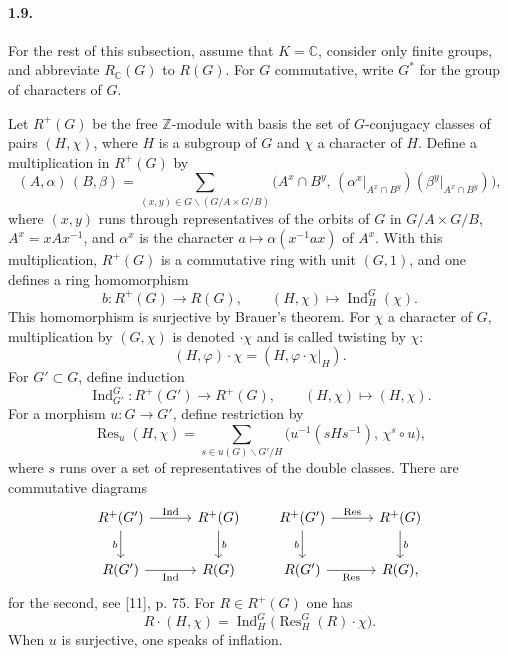 \documentclass[10pt]{article}
\newcommand{\C}{\mathbb C}
\newcommand{\Z}{\mathbb Z}
\newcommand{\Ind}{\operatorname{Ind}}
\newcommand{\Res}{\operatorname{Res}}
\begin{document}
\paragraph{1.9.} For the rest of this subsection, assume that \(K=\C\), consider only finite groups, and abbreviate \(R_\C(G)\) to \(R(G)\). For \(G\) commutative, write \(G^*\) for the group of characters of \(G\).

Let \(R^+(G)\) be the free \(\Z\)-module with basis the set of \(G\)-conjugacy classes of pairs \((H,\chi)\), where \(H\) is a subgroup of \(G\) and \(\chi\) a character of \(H\). Define a multiplication in \(R^+(G)\) by
\[
\tag{1.9.1}
(A,\alpha)\,(B,\beta)=
\sum_{(x,y)\in G\backslash(G/A\times G/B)}
\bigl(A^x\cap B^y,\,
(\alpha^x|_{A^x\cap B^y})(\beta^y|_{A^x\cap B^y})\bigr),
\]
where \((x,y)\) runs through representatives of the orbits of \(G\) in \(G/A\times G/B\), \(A^x=xAx^{-1}\), and \(\alpha^x\) is the character \(a\mapsto \alpha(x^{-1}ax)\) of \(A^x\). With this multiplication, \(R^+(G)\) is a commutative ring with unit \((G,1)\), and one defines a ring homomorphism
\[
\tag{1.9.2}
b:R^+(G)\longrightarrow R(G),\qquad (H,\chi)\longmapsto \Ind_H^G(\chi).
\]
This homomorphism is surjective by Brauer's theorem. For \(\chi\) a character of \(G\), multiplication by \((G,\chi)\) is denoted \(\cdot\chi\) and is called twisting by \(\chi\):
\[
\tag{1.9.3}
(H,\varphi)\cdot\chi=(H,\varphi\cdot\chi|_H).
\]
For \(G'\subset G\), define induction
\[
\tag{1.9.4}
\Ind_{G'}^G:R^+(G')\longrightarrow R^+(G),\qquad (H,\chi)\longmapsto(H,\chi).
\]
For a morphism \(u:G\to G'\), define restriction by
\[
\tag{1.9.5}
\Res_u(H,\chi)=
\sum_{s\in u(G)\backslash G'/H}
\bigl(u^{-1}(sHs^{-1}),\,\chi^s\circ u\bigr),
\]
where \(s\) runs over a set of representatives of the double classes. There are commutative diagrams
\[
\begin{tikzcd}[column sep=3.0em,row sep=2.0em]
R^+(G') \arrow[r,"\Ind"] \arrow[d,"b"'] & R^+(G) \arrow[d,"b"]\\
R(G') \arrow[r,"\Ind"'] & R(G)
\end{tikzcd}
\qquad
\begin{tikzcd}[column sep=3.0em,row sep=2.0em]
R^+(G') \arrow[r,"\Res"] \arrow[d,"b"'] & R^+(G) \arrow[d,"b"]\\
R(G') \arrow[r,"\Res"'] & R(G),
\end{tikzcd}
\]
for the second, see [11], p. 75. For \(R\in R^+(G)\) one has
\[
\tag{1.9.6}
R\cdot(H,\chi)=\Ind_H^G\bigl(\Res_H^G(R)\cdot\chi\bigr).
\]
When \(u\) is surjective, one speaks of inflation.
\end{document}
